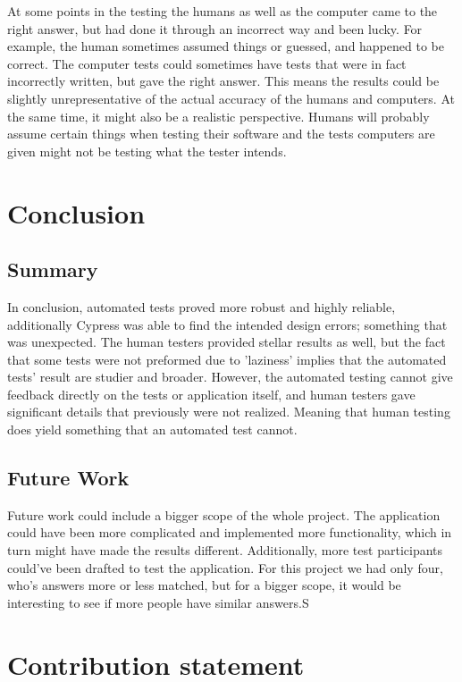 \documentclass[journal,twocolumn]{IEEEtran}
\begin{document}
At some points in the testing the humans as well as the computer came to the right answer, but had done it through an incorrect way and been lucky. For example, the human sometimes assumed things or guessed, and happened to be correct. The computer tests could sometimes have tests that were in fact incorrectly written, but gave the right answer. This means the results could be slightly unrepresentative of the actual accuracy of the humans and computers. At the same time, it might also be a realistic perspective. Humans will probably assume certain things when testing their software and the tests computers are given might not be testing what the tester intends.

\section{Conclusion}
\subsection{Summary}
In conclusion, automated tests proved more robust and highly reliable, additionally Cypress was able to find the intended design errors; something that was unexpected. The human testers provided stellar results as well, but the fact that some tests were not preformed due to 'laziness' implies that the automated tests' result are studier and broader.
However, the automated testing cannot give feedback directly on the tests or application itself, and human testers gave significant details that previously were not realized. Meaning that human testing does yield something that an automated test cannot.

\subsection{Future Work}
Future work could include a bigger scope of the whole project. The application could have been more complicated and implemented more functionality, which in turn might have made the results different.
Additionally, more test participants could've been drafted to test the application. For this project we had only four, who's answers more or less matched, but for a bigger scope, it would be interesting to see if more people have similar answers.S

\section{Contribution statement}
\end{document}
